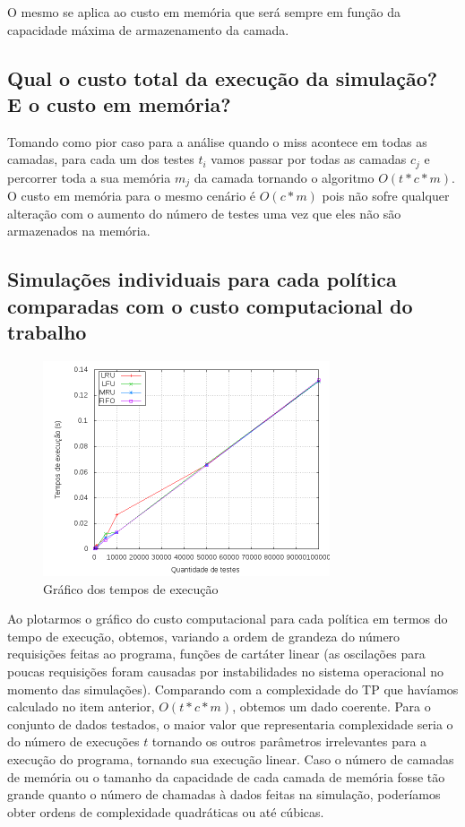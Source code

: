 \documentclass[12pt]{article}
\begin{document}
O mesmo se aplica ao custo em memória que será sempre em função da capacidade
máxima de armazenamento da camada.

\subsection{Qual o custo total da execução da simulação? E o custo em memória?}

Tomando como pior caso para a análise quando o miss acontece em todas as
camadas, para cada um dos testes $t_{i}$ vamos passar por todas as camadas
$c_{j}$ e percorrer toda a sua memória $m_{j}$ da camada tornando o algoritmo
$O(t*c*m)$. O custo em memória para o mesmo cenário é $O(c*m)$ pois não sofre
qualquer alteração com o aumento do número de testes uma vez que eles não são
armazenados na memória.

\newpage

\subsection{Simulações individuais para cada política comparadas com o custo
computacional do trabalho}

\begin{figure}[ht!]
\centering
\includegraphics[width=320px,height=240px]{testes.png}
\caption{Gráfico dos tempos de execução}
\end{figure}

Ao plotarmos o gráfico do custo computacional para cada política em termos do tempo de execução, obtemos, variando a ordem de grandeza do número requisições feitas ao programa, funções de cartáter linear (as oscilações para poucas requisições foram causadas por instabilidades no sistema operacional no momento das simulações). Comparando com a complexidade do TP que havíamos calculado no item anterior, $O(t*c*m)$, obtemos um dado coerente. Para o conjunto de dados testados, o maior valor que representaria complexidade seria o do número de execuções $t$ tornando os outros parâmetros irrelevantes para a execução do programa, tornando sua execução linear. Caso o número de camadas de memória ou o tamanho da capacidade de cada camada de memória fosse tão grande quanto o número de chamadas à dados feitas na simulação, poderíamos obter ordens de complexidade quadráticas ou até cúbicas.
\end{document}
